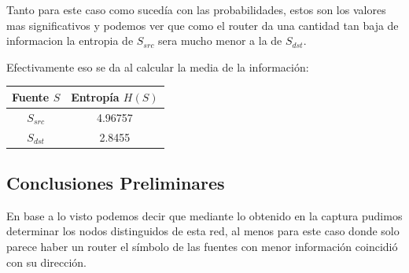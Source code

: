 	\par Tanto para este caso como sucedía con las probabilidades, estos son los valores mas significativos y podemos ver que como el router da una cantidad tan baja de informacion la entropia de $S_{src}$ sera mucho menor a la de $S_{dst}$.

	\par Efectivamente eso se da al calcular la media de la información:
    
\vspace{6 mm}

\begin{center}
\begin{tabular}{|c|c|}
\hline
Fuente $S$ & Entropía $H(S)$\\
\hline
$S_{src}$ & 4.96757\\
$S_{dst}$ & 2.8455\\
\hline
\end{tabular}
\end{center}

\subsection{Conclusiones Preliminares}

\par En base a lo visto podemos decir que mediante lo obtenido en la captura pudimos determinar los nodos distinguidos de esta red, al menos para este caso donde solo parece haber un router el símbolo de las fuentes con menor información coincidió con su dirección.
